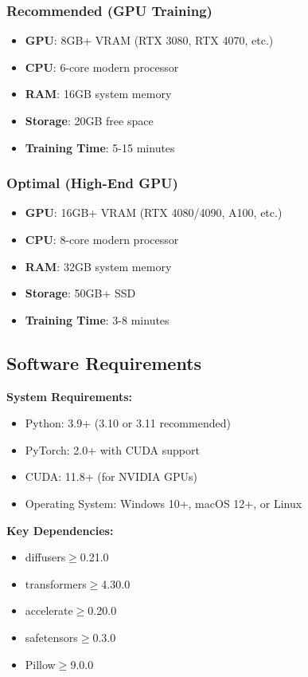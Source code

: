 \documentclass[11pt,a4paper]{article}
\begin{document}
\subsubsection{Recommended (GPU Training)}
\begin{itemize}
    \item \textbf{GPU}: 8GB+ VRAM (RTX 3080, RTX 4070, etc.)
    \item \textbf{CPU}: 6-core modern processor
    \item \textbf{RAM}: 16GB system memory
    \item \textbf{Storage}: 20GB free space
    \item \textbf{Training Time}: 5-15 minutes
\end{itemize}

\subsubsection{Optimal (High-End GPU)}
\begin{itemize}
    \item \textbf{GPU}: 16GB+ VRAM (RTX 4080/4090, A100, etc.)
    \item \textbf{CPU}: 8-core modern processor
    \item \textbf{RAM}: 32GB system memory
    \item \textbf{Storage}: 50GB+ SSD
    \item \textbf{Training Time}: 3-8 minutes
\end{itemize}

\subsection{Software Requirements}

\begin{infobox}
\textbf{System Requirements:}
\begin{itemize}
    \item Python: 3.9+ (3.10 or 3.11 recommended)
    \item PyTorch: 2.0+ with CUDA support
    \item CUDA: 11.8+ (for NVIDIA GPUs)
    \item Operating System: Windows 10+, macOS 12+, or Linux
\end{itemize}

\textbf{Key Dependencies:}
\begin{itemize}
    \item diffusers$\geq$0.21.0
    \item transformers$\geq$4.30.0
    \item accelerate$\geq$0.20.0
    \item safetensors$\geq$0.3.0
    \item Pillow$\geq$9.0.0
\end{itemize}
\end{infobox}
\end{document}
